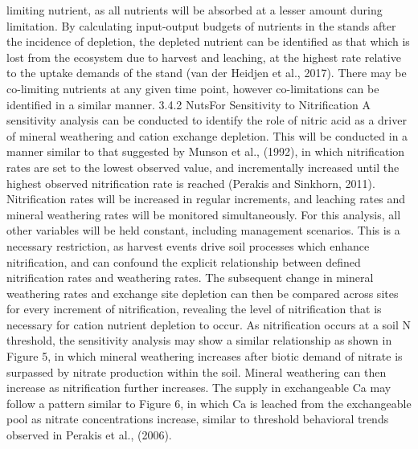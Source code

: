 \documentclass{article}
\begin{document}
limiting nutrient, as all nutrients will be absorbed at a lesser amount during limitation. By
calculating input-output budgets of nutrients in the stands after the incidence of depletion, the
depleted nutrient can be identified as that which is lost from the ecosystem due to harvest and
leaching, at the highest rate relative to the uptake demands of the stand (van der Heidjen et al.,
2017). There may be co-limiting nutrients at any given time point, however co-limitations can be
identified in a similar manner.
3.4.2 NutsFor Sensitivity to Nitrification
A sensitivity analysis can be conducted to identify the role of nitric acid as a driver of mineral
weathering and cation exchange depletion. This will be conducted in a manner similar to that
suggested by Munson et al., (1992), in which nitrification rates are set to the lowest observed
value, and incrementally increased until the highest observed nitrification rate is reached (Perakis
and Sinkhorn, 2011). Nitrification rates will be increased in regular increments, and leaching
rates and mineral weathering rates will be monitored simultaneously. For this analysis, all other
variables will be held constant, including management scenarios. This is a necessary restriction,
as harvest events drive soil processes which enhance nitrification, and can confound the explicit
relationship between defined nitrification rates and weathering rates.
The subsequent change in mineral weathering rates and exchange site depletion can then be
compared across sites for every increment of nitrification, revealing the level of nitrification that
is necessary for cation nutrient depletion to occur. As nitrification occurs at a soil N threshold,
the sensitivity analysis may show a similar relationship as shown in Figure 5, in which mineral
weathering increases after biotic demand of nitrate is surpassed by nitrate production within the
soil. Mineral weathering can then increase as nitrification further increases. The supply in
exchangeable Ca may follow a pattern similar to Figure 6, in which Ca is leached from the
exchangeable pool as nitrate concentrations increase, similar to threshold behavioral trends
observed in Perakis et al., (2006).





\end{document}
